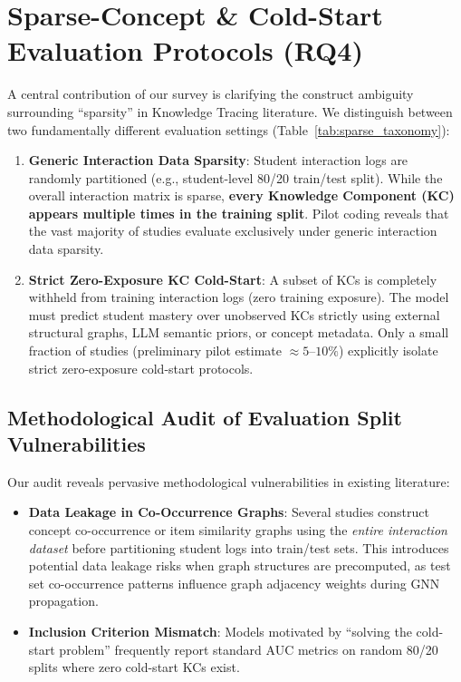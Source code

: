 \documentclass[10pt,journal,compsoc]{IEEEtran}
\begin{document}
\section{Sparse-Concept \& Cold-Start Evaluation Protocols (RQ4)}

A central contribution of our survey is clarifying the construct ambiguity surrounding ``sparsity'' in Knowledge Tracing literature. We distinguish between two fundamentally different evaluation settings (Table~\ref{tab:sparse_taxonomy}):
\begin{enumerate}
    \item \textbf{Generic Interaction Data Sparsity}: Student interaction logs are randomly partitioned (e.g., student-level 80/20 train/test split). While the overall interaction matrix is sparse, \textbf{every Knowledge Component (KC) appears multiple times in the training split}. Pilot coding reveals that the vast majority of studies evaluate exclusively under generic interaction data sparsity.
    \item \textbf{Strict Zero-Exposure KC Cold-Start}: A subset of KCs is completely withheld from training interaction logs (zero training exposure). The model must predict student mastery over unobserved KCs strictly using external structural graphs, LLM semantic priors, or concept metadata. Only a small fraction of studies (preliminary pilot estimate $\approx 5$--$10\%$) explicitly isolate strict zero-exposure cold-start protocols.
\end{enumerate}

\subsection{Methodological Audit of Evaluation Split Vulnerabilities}
Our audit reveals pervasive methodological vulnerabilities in existing literature:
\begin{itemize}
    \item \textbf{Data Leakage in Co-Occurrence Graphs}: Several studies construct concept co-occurrence or item similarity graphs using the \emph{entire interaction dataset} before partitioning student logs into train/test sets. This introduces potential data leakage risks when graph structures are precomputed, as test set co-occurrence patterns influence graph adjacency weights during GNN propagation.
    \item \textbf{Inclusion Criterion Mismatch}: Models motivated by ``solving the cold-start problem'' frequently report standard AUC metrics on random 80/20 splits where zero cold-start KCs exist.
\end{itemize}
\end{document}
